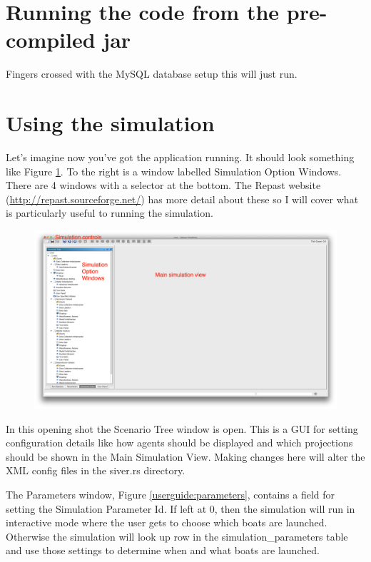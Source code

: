 \section{Running the code from the pre-compiled jar}
Fingers crossed with the MySQL database setup this will just run.

\section{Using the simulation}
Let's imagine now you've got the application running. It should look something like Figure \ref{userguide:openingscreen}.  To the right is a window labelled Simulation Option Windows. There are 4 windows with a selector at the bottom. The Repast website (\url{http://repast.sourceforge.net/}) has more detail about these so I will cover what is particularly useful to running the simulation. 

\begin{figure}
\begin{center}
  \includegraphics[scale=0.2]{images/screenshots/openingscreen.png}
  \caption{}
  \label{userguide:openingscreen}
\end{center}
\end{figure}

In this opening shot the Scenario Tree window is open. This is a GUI for setting configuration details  like how agents should be displayed and which projections should be shown in the Main Simulation View. Making changes here will alter the XML config files in the siver.rs directory.

The Parameters window, Figure \ref{userguide:parameters}, contains a field for setting the Simulation Parameter Id. If left at 0, then the simulation will run in interactive mode where the user gets to choose which boats are launched. Otherwise the simulation will look up row in the simulation\_parameters table and use those settings to determine when and what boats are launched.

